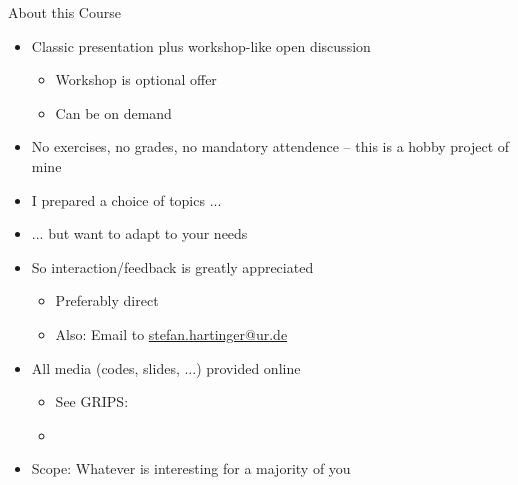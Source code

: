 
\begin{frame}{About this Course}
%
\begin{itemize}
\item Classic presentation plus workshop-like open discussion
	\begin{itemize}
	\item Workshop is optional offer
	\item Can be on demand
	\end{itemize}
\item No exercises, no grades, no mandatory attendence -- this is a hobby project of mine
\item I prepared a choice of topics ...
\item ... but want to adapt to your needs
\item So interaction/feedback is greatly appreciated
	\begin{itemize}
	\item Preferably direct
	\item Also: Email to \href{mailto:stefan.hartinger@ur.de}{stefan.hartinger@ur.de}
	\end{itemize}
\item All media (codes, slides, ...) provided online
	\begin{itemize}
	\item See GRIPS: 
	\item {}
	\end{itemize}
\item Scope: Whatever is interesting for a majority of you
\end{itemize}
%
\end{frame}


